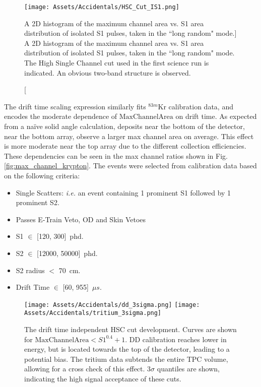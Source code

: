 \begin{figure}
    \centering
    \texttt{[image: Assets/Accidentals/HSC\_Cut\_IS1.png]}
    \caption[A 2D histogram of the maximum channel area vs.
    S1 area distribution of isolated S1 pulses, taken in the ``long random" mode.]%
    {A 2D histogram of the maximum channel area vs.
    S1 area distribution of isolated S1 pulses, taken in the ``long random" mode.
    The High Single Channel cut used in the first science run is indicated.
    An obvious two-band structure is observed.}
    \label{fig:hsc_cut_is1}
\end{figure}


The drift time scaling expression similarly fits $^{83m}$Kr calibration data, and encodes the moderate dependence of $\text{MaxChannelArea}$ on drift time.
As expected from a na\"ive solid angle calculation, deposits near the bottom of the detector, near the bottom array, observe a larger max channel area on average.
This effect is more moderate near the top array due to the different collection efficiencies.
These dependencies can be seen in the max channel ratios shown in Fig. \ref{fig:max_channel_krypton}.
The events were selected from calibration data based on the following criteria:

\begin{itemize}
    \item Single Scatters: \textit{i.e.} an event containing 1 prominent S1 followed by 1 prominent S2.
    \item Passes E-Train Veto, OD and Skin Vetoes
    \item S1 $\in$ [120, 300]~phd.
    \item S2 $\in$ [12000, 50000]~phd.
    \item S2 radius $<$ 70~cm.
    \item Drift Time $\in$ [60, 955]~$\mu s$.
\end{itemize}

\begin{figure}
    \centering
    \texttt{[image: Assets/Accidentals/dd\_3sigma.png]}
    \texttt{[image: Assets/Accidentals/tritium\_3sigma.png]}
    \caption[The drift time independent HSC cut development. Curves are shown for $\text{MaxChannelArea}<S1^{0.4}+1$.]%
    {The drift time independent HSC cut development. Curves are shown for $\text{MaxChannelArea}<S1^{0.4}+1$.
    DD calibration reaches lower in energy, but is located towards the top of the detector, leading to a potential bias.
    The tritium data subtends the entire TPC volume, allowing for a cross check of this effect.
    3$\sigma$ quantiles are shown, indicating the high signal acceptance of these cuts.}
    \label{fig:hsc_cut_dev}
\end{figure}

